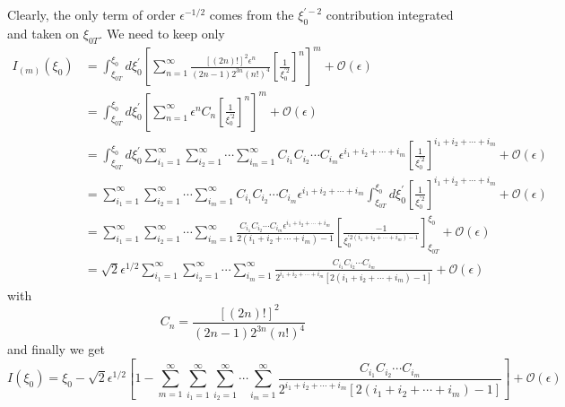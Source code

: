 Clearly, the only term of order $\epsilon^{-1/2}$ comes from the $\xi
_{0}^{\prime-2}$ contribution integrated and taken on $\xi_{0T}$. We need to
keep only%
\begin{align*}
I_{\left(  m\right)  }\left(  \xi_{0}\right)   &  =\int_{\xi_{0T}}^{\xi_{0}%
}d\xi_{0}^{\prime}\left[  \sum_{n=1}^{\infty}\frac{\left[  \left(  2n\right)
!\right]  ^{2}\epsilon^{n}}{\left(  2n-1\right)  2^{3n}\left(  n!\right)
^{4}}\left[  \frac{1}{\xi_{0}^{\prime2}}\right]  ^{n}\right]  ^{m}%
+\mathcal{O}\left(  \epsilon\right)  \\
&  =\int_{\xi_{0T}}^{\xi_{0}}d\xi_{0}^{\prime}\left[  \sum_{n=1}^{\infty
}\epsilon^{n}C_{n}\left[  \frac{1}{\xi_{0}^{\prime2}}\right]  ^{n}\right]
^{m}+\mathcal{O}\left(  \epsilon\right)  \\
&  =\int_{\xi_{0T}}^{\xi_{0}}d\xi_{0}^{\prime}\sum_{i_{1}=1}^{\infty}%
\sum_{i_{2}=1}^{\infty}\cdots\sum_{i_{m}=1}^{\infty}C_{i_{1}}C_{i_{2}}\cdots
C_{i_{m}}\epsilon^{i_{1}+i_{2}+\cdots+i_{m}}\left[  \frac{1}{\xi_{0}^{\prime
2}}\right]  ^{i_{1}+i_{2}+\cdots+i_{m}}+\mathcal{O}\left(  \epsilon\right)  \\
&  =\sum_{i_{1}=1}^{\infty}\sum_{i_{2}=1}^{\infty}\cdots\sum_{i_{m}=1}%
^{\infty}C_{i_{1}}C_{i_{2}}\cdots C_{i_{m}}\epsilon^{i_{1}+i_{2}+\cdots+i_{m}%
}\int_{\xi_{0T}}^{\xi_{0}}d\xi_{0}^{\prime}\left[  \frac{1}{\xi_{0}^{\prime2}%
}\right]  ^{i_{1}+i_{2}+\cdots+i_{m}}+\mathcal{O}\left(  \epsilon\right)  \\
&  =\sum_{i_{1}=1}^{\infty}\sum_{i_{2}=1}^{\infty}\cdots\sum_{i_{m}=1}%
^{\infty}\frac{C_{i_{1}}C_{i_{2}}\cdots C_{i_{m}}\epsilon^{i_{1}+i_{2}%
+\cdots+i_{m}}}{2\left(  i_{1}+i_{2}+\cdots+i_{m}\right)  -1}\left[  \frac
{-1}{\xi_{0}^{\prime2\left(  i_{1}+i_{2}+\cdots+i_{m}\right)  -1}}\right]
_{\xi_{0T}}^{\xi_{0}}+\mathcal{O}\left(  \epsilon\right)  \\
&  =\sqrt{2}\epsilon^{1/2}\sum_{i_{1}=1}^{\infty}\sum_{i_{2}=1}^{\infty}%
\cdots\sum_{i_{m}=1}^{\infty}\frac{C_{i_{1}}C_{i_{2}}\cdots C_{i_{m}}%
}{2^{i_{1}+i_{2}+\cdots+i_{m}}\left[  2\left(  i_{1}+i_{2}+\cdots
+i_{m}\right)  -1\right]  }+\mathcal{O}\left(  \epsilon\right)
\end{align*}
with%
\[
C_{n}=\frac{\left[  \left(  2n\right)  !\right]  ^{2}}{\left(  2n-1\right)
2^{3n}\left(  n!\right)  ^{4}}%
\]
and finally we get%
\[
I\left(  \xi_{0}\right)  =\xi_{0}-\sqrt{2}\epsilon^{1/2}\left[  1-\sum
_{m=1}^{\infty}\sum_{i_{1}=1}^{\infty}\sum_{i_{2}=1}^{\infty}\cdots\sum
_{i_{m}=1}^{\infty}\frac{C_{i_{1}}C_{i_{2}}\cdots C_{i_{m}}}{2^{i_{1}%
+i_{2}+\cdots+i_{m}}\left[  2\left(  i_{1}+i_{2}+\cdots+i_{m}\right)
-1\right]  }\right]  +\mathcal{O}\left(  \epsilon\right)
\]%
